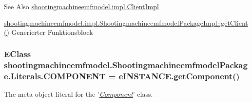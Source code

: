 \begin{DoxySeeAlso}{See Also}
\hyperlink{classshootingmachineemfmodel_1_1impl_1_1_client_impl}{shootingmachineemfmodel.\-impl.\-Client\-Impl} 

\hyperlink{classshootingmachineemfmodel_1_1impl_1_1_shootingmachineemfmodel_package_impl_a123185c43f45f06c9153fad113ff5642}{shootingmachineemfmodel.\-impl.\-Shootingmachineemfmodel\-Package\-Impl\-::get\-Client()} Generierter Funktionsblock 
\end{DoxySeeAlso}
\hypertarget{interfaceshootingmachineemfmodel_1_1_shootingmachineemfmodel_package_1_1_literals_af05b7cb28e9a2e08bd406d349281ba61}{
\subsubsection[{C\-O\-M\-P\-O\-N\-E\-N\-T}]{\setlength{\rightskip}{0pt plus 5cm}E\-Class shootingmachineemfmodel.\-Shootingmachineemfmodel\-Package.\-Literals.\-C\-O\-M\-P\-O\-N\-E\-N\-T = e\-I\-N\-S\-T\-A\-N\-C\-E.\-get\-Component()}}\label{interfaceshootingmachineemfmodel_1_1_shootingmachineemfmodel_package_1_1_literals_af05b7cb28e9a2e08bd406d349281ba61}
The meta object literal for the '\hyperlink{classshootingmachineemfmodel_1_1impl_1_1_component_impl}{{\itshape Component}}' class.


